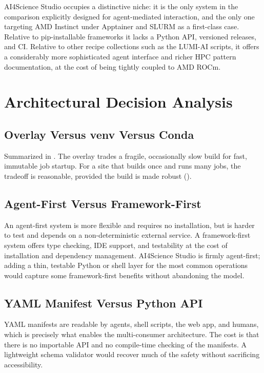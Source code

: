 \documentclass[11pt]{article}
\begin{document}
AI4Science Studio occupies a distinctive niche: it is the only system in the
comparison explicitly designed for agent-mediated interaction, and the only one
targeting AMD Instinct under Apptainer and SLURM as a first-class case. Relative to
pip-installable frameworks it lacks a Python API, versioned releases, and CI. Relative
to other recipe collections such as the LUMI-AI scripts, it offers a considerably more
sophisticated agent interface and richer HPC pattern documentation, at the cost of
being tightly coupled to AMD ROCm.

\section{Architectural Decision Analysis}
\label{sec:decisions}

\subsection{Overlay Versus venv Versus Conda}
Summarized in . The overlay trades a fragile, occasionally slow
build for fast, immutable job startup. For a site that builds once and runs many jobs,
the tradeoff is reasonable, provided the build is made robust ().

\subsection{Agent-First Versus Framework-First}
An agent-first system is more flexible and requires no installation, but is harder to
test and depends on a non-deterministic external service. A framework-first system
offers type checking, IDE support, and testability at the cost of installation and
dependency management. AI4Science Studio is firmly agent-first; adding a thin,
testable Python or shell layer for the most common operations would capture some
framework-first benefits without abandoning the model.

\subsection{YAML Manifest Versus Python API}
YAML manifests are readable by agents, shell scripts, the web app, and humans, which
is precisely what enables the multi-consumer architecture. The cost is that there is no
importable API and no compile-time checking of the manifests. A lightweight schema
validator would recover much of the safety without sacrificing accessibility.
\end{document}
